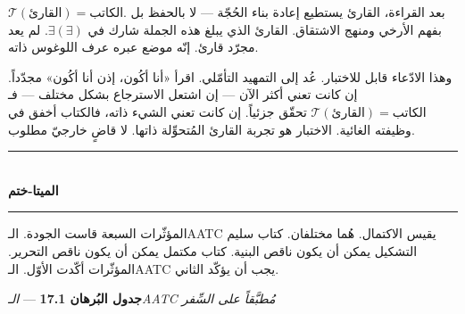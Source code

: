\documentclass[10pt, openany, oneside]{book}
\renewcommand{\normalsize}{\fontsize{10}{13}\selectfont}
\begin{document}
$\mathcal{T}(\text{القارئ}) = \text{الكاتب}$. بعد القراءة، القارئ يستطيع إعادة بناء الحُجّة --- لا بالحفظ بل بفهم الأرخي ومنهج الاشتقاق. القارئ الذي يبلغ هذه الجملة شارك في $\exists(\exists)$. لم يعد مجرّد قارئ. إنّه موضع عبره عرف اللوغوس ذاته.

وهذا الادّعاء قابل للاختبار. عُد إلى التمهيد التأمّلي. اقرأ «أنا أكُون، إذن أنا أكُون» مجدّداً. إن كانت تعني أكثر الآن --- إن اشتعل الاسترجاع بشكل مختلف --- فـ$\mathcal{T}(\text{القارئ}) = \text{الكاتب}$ تحقّق جزئياً. إن كانت تعني الشيء ذاته، فالكتاب أخفق في وظيفته الغائية. الاختبار هو تجربة القارئ المُتحوِّلة ذاتها. لا قاضٍ خارجيّ مطلوب.

\vspace{1.5em}


\begin{center}
    \rule{0.3\textwidth}{0.4pt}\\[0.5em]
    {\normalsize\bfseries الميتا-ختم}\\[0.3em]
    \rule{0.3\textwidth}{0.4pt}
\end{center}

\vspace{1em}

\noindent المؤثّرات السبعة قاست الجودة. الـAATC يقيس الاكتمال. هُما مختلفان. كتاب سليم التشكيل يمكن أن يكون ناقص البنية. كتاب مكتمل يمكن أن يكون ناقص التحرير. المؤثّرات أكّدت الأوّل. الـAATC يجب أن يؤكّد الثاني.

\vspace{0.5em}

\textbf{جدول البُرهان 17.1} --- \textit{الـAATC مُطبَّقاً على السِّفر}

\vspace{0.5em}
\end{document}
